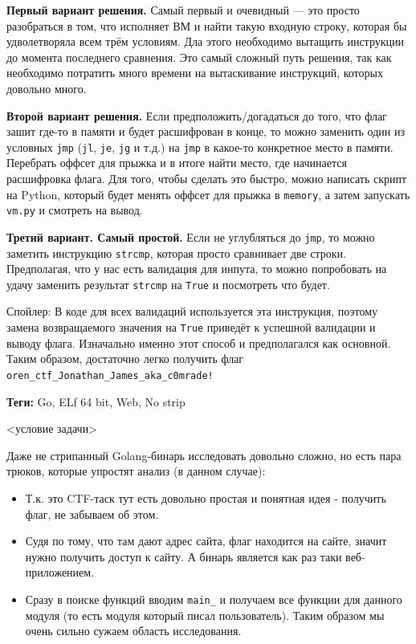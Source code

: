 \documentclass[idxtotoc,hyperref,openany,oneside]{files/reverse} %
\begin{document}
\textbf{Первый вариант решения.}
Самый первый и очевидный — это просто разобраться в том, что исполняет ВМ и найти такую входную строку, которая бы удволетворяла всем трём условиям. Дла этого необходимо вытащить инструкции до момента последнего сравнения. Это самый сложный путь решения, так как необходимо потратить много времени на вытаскивание инструкций, которых довольно много.

\textbf{Второй вариант решения.}
Если предположить/догадаться до того, что флаг зашит где-то в памяти и будет расшифрован в конце, то можно заменить один из условных \verb|jmp| (\verb|jl|, \verb|je|, \verb|jg| и т.д.) на \verb|jmp| в какое-то конкретное место в памяти. Перебрать оффсет для прыжка и в итоге найти место, где начинается расшифровка флага. Для того, чтобы сделать это быстро, можно написать скрипт на Python, который будет менять оффсет для прыжка в \verb|memory|, а затем запускать \verb|vm.py| и смотреть на вывод.

\textbf{Третий вариант. Самый простой.}
Если не углубляться до \verb|jmp|, то можно заметить инструкцию \verb|strcmp|, которая просто сравнивает две строки. Предполагая, что у нас есть валидация для инпута, то можно попробовать на удачу заменить результат \verb|strcmp| на \verb|True| и посмотреть что будет.

Спойлер: В коде для всех валидаций используется эта инструкция, поэтому замена возвращаемого значения на \verb|True| приведёт к успешной валидации и выводу флага. Изначально именно этот способ и предполагался как основной. Таким образом, достаточно легко получить флаг \verb|oren_ctf_Jonathan_James_aka_c0mrade!|


\textbf{Теги:} Go, ELf 64 bit, Web, No strip\vspace{\baselineskip}

\begin{tcolorbox}
<условие задачи>
\end{tcolorbox}

Даже не стрипанный Golang-бинарь исследовать довольно сложно, но есть пара трюков, которые упростят анализ (в данном случае):
\begin{itemize}
\item Т.к. это CTF-таск тут есть довольно простая и понятная идея - получить флаг, не забываем об этом.
\item Судя по тому, что там дают адрес сайта, флаг находится на сайте, значит нужно получить доступ к сайту. А бинарь является как раз таки веб-приложением.
\item Сразу в поиске функций вводим \verb|main_| и получаем все функции для данного модуля (то есть модуля который писал пользователь). Таким образом мы очень сильно сужаем область исследования.
\end{itemize}
\end{document}
